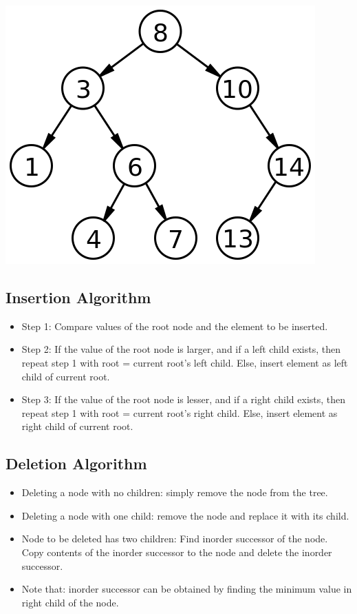 \documentclass[12pt]{article}
\begin{document}
  \begin{center}
  \includegraphics[width=\linewidth/2]{binarytree.png}
  \end{center}
\subsection{Insertion Algorithm}
    \begin{itemize}
        \item Step 1: Compare values of the root node and the element to be inserted.
        
        \item Step 2: If the value of the root node is larger, and if a left child exists, then repeat step 1 with root = current root's left child. Else, insert element as left child of current root.
        
        \item Step 3: If the value of the root node is lesser, and if a right child exists, then repeat step 1 with root = current root's right child. Else, insert element as right child of current root.

    \end{itemize}



\newpage
\subsection{Deletion Algorithm}

    \begin{itemize}
        \item Deleting a node with no children: simply remove the node from the tree.
        \item Deleting a node with one child: remove the node and replace it with its child.
        \item Node to be deleted has two children: Find inorder successor of the node. Copy contents of the inorder successor to the node and delete the inorder successor.
        \item Note that: inorder successor can be obtained by finding the minimum value in right child of the node.
    \end{itemize}
    
\end{document}
